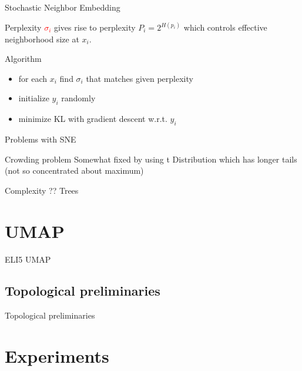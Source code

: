 \documentclass[unknownkeysallowed]{beamer}
\begin{document}
\begin{frame}{Stochastic Neighbor Embedding}

\begin{block}{Perplexity}
\textcolor{red}{$\sigma_i$} gives rise to perplexity $P_i = 2^{H(p_i)}$ which controls effective neighborhood size at $x_i$.
\end{block}

\begin{block}{Algorithm}
\begin{itemize}
	\item for each $x_i$ find $\sigma_i$ that matches given perplexity
    \item initialize $y_i$ randomly
    \item minimize KL with gradient descent w.r.t. $y_i$
\end{itemize}
\end{block}

\end{frame}


\begin{frame}{Problems with SNE}

\begin{block}{Crowding problem}
Somewhat fixed by using t Distribution which has longer tails (not so concentrated about maximum)
\end{block}

\begin{block}{Complexity}
?? Trees
\end{block}

\end{frame}

\section{UMAP}


\begin{frame}{ELI5 UMAP}

\end{frame}

\subsection{Topological preliminaries}


\begin{frame}{Topological preliminaries}

\end{frame}

\section{Experiments}
\end{document}
